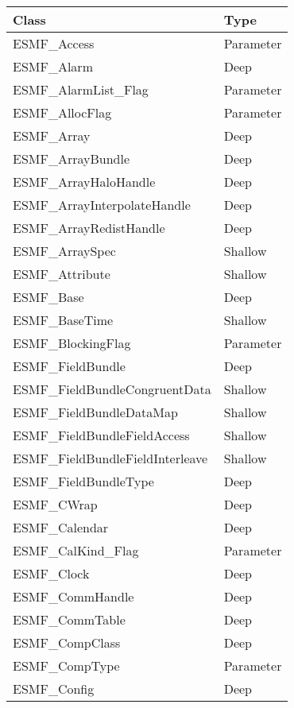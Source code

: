 \begin{table}[t]
\begin{tabular}{ll}

{\bf Class} & {\bf Type} \\ \hline

ESMF\_Access               &  Parameter \\
ESMF\_Alarm                &  Deep \\
ESMF\_AlarmList\_Flag      & Parameter \\
ESMF\_AllocFlag            &  Parameter \\
ESMF\_Array                & Deep \\
ESMF\_ArrayBundle          &  Deep \\
ESMF\_ArrayHaloHandle       & Deep \\
ESMF\_ArrayInterpolateHandle & Deep \\
ESMF\_ArrayRedistHandle     & Deep \\
ESMF\_ArraySpec             & Shallow\\
ESMF\_Attribute             & Shallow\\
ESMF\_Base                  & Deep \\
ESMF\_BaseTime              & Shallow\\
ESMF\_BlockingFlag          & Parameter \\
ESMF\_FieldBundle                & Deep \\
ESMF\_FieldBundleCongruentData   & Shallow\\
ESMF\_FieldBundleDataMap         & Shallow\\
ESMF\_FieldBundleFieldAccess     & Shallow\\
ESMF\_FieldBundleFieldInterleave & Shallow\\
ESMF\_FieldBundleType            & Deep \\ 
ESMF\_CWrap                 & Deep \\
ESMF\_Calendar              & Deep \\
ESMF\_CalKind\_Flag         & Parameter \\
ESMF\_Clock                 & Deep \\
ESMF\_CommHandle            & Deep \\
ESMF\_CommTable             & Deep \\
ESMF\_CompClass             & Deep \\
ESMF\_CompType              & Parameter \\
ESMF\_Config                & Deep \\

\end{tabular}
\end{table}
